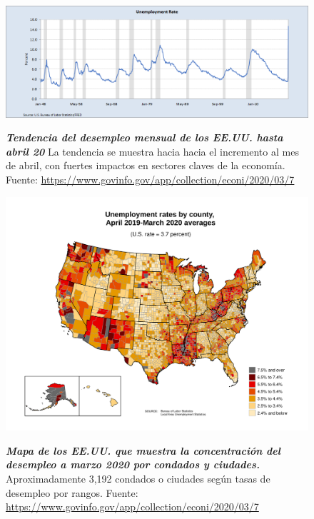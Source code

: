 \begin{figure}[H]
	\centering
	\resizebox{16.5cm}{!} { 
	\includegraphics[width=1\linewidth]{Imagenes/Desempleo_USA_G}}
	\caption{\textbf{\textit{Tendencia del desempleo mensual de los EE.UU. hasta abril 20}} {\small La tendencia se muestra hacia hacia el incremento al mes de abril, con fuertes impactos en sectores claves de la economía. Fuente:  \href{https://www.govinfo.gov/app/collection/econi/2020/03/7}{https://www.govinfo.gov/app/collection/econi/2020/03/7}}
	} 
	\label{fig:4}
	
\end{figure}


\begin{figure}[H]
	\centering
	\resizebox{17 cm}{!} { 
	\includegraphics[width=1\linewidth]{Imagenes/Desempleo_USA}}
	\caption{\textbf{\textit{Mapa de los EE.UU. que muestra la concentración del desempleo a marzo 2020 por condados y ciudades.}}
	{\small Aproximadamente 3,192 condados o ciudades según tasas de desempleo por rangos. Fuente:  \href{https://www.govinfo.gov/app/collection/econi/2020/03/7}{https://www.govinfo.gov/app/collection/econi/2020/03/7}}
	} 
	\label{fig:5}
	
\end{figure}
  
